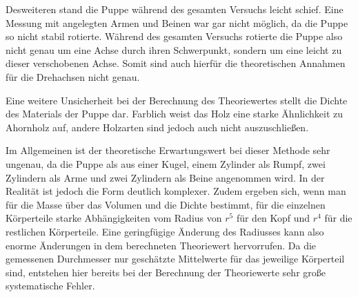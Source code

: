 Desweiteren stand die Puppe während des gesamten Versuchs leicht schief. Eine Messung mit
angelegten Armen und Beinen war gar nicht möglich, da die Puppe so nicht stabil rotierte.
Während des gesamten Versuchs rotierte die Puppe also nicht genau um eine Achse durch
ihren Schwerpunkt, sondern um eine leicht zu dieser verschobenen Achse.
Somit sind auch hierfür die theoretischen Annahmen für die Drehachsen nicht genau.

Eine weitere Unsicherheit bei der Berechnung des Theoriewertes stellt die Dichte
des Materials der Puppe dar. Farblich weist das Holz eine starke Ähnlichkeit zu
Ahornholz auf, andere Holzarten sind jedoch auch nicht auszuschließen.

Im Allgemeinen ist der theoretische Erwartungswert bei dieser Methode sehr ungenau,
da die Puppe als aus einer Kugel, einem Zylinder als Rumpf, zwei Zylindern als Arme
und zwei Zylindern als Beine angenommen wird. In der Realität ist jedoch die Form deutlich
komplexer. Zudem ergeben sich, wenn man für die Masse über das Volumen und die Dichte bestimmt,
für die einzelnen Körperteile starke Abhängigkeiten vom Radius von $r^5$ für den Kopf
und $r^4$ für die restlichen Körperteile. Eine geringfügige Änderung des Radiusses
kann also enorme Änderungen in dem berechneten Theoriewert hervorrufen. Da die gemessenen
Durchmesser nur geschätzte Mittelwerte für das jeweilige Körperteil sind, entstehen
hier bereits bei der Berechnung der Theoriewerte sehr große systematische Fehler.
